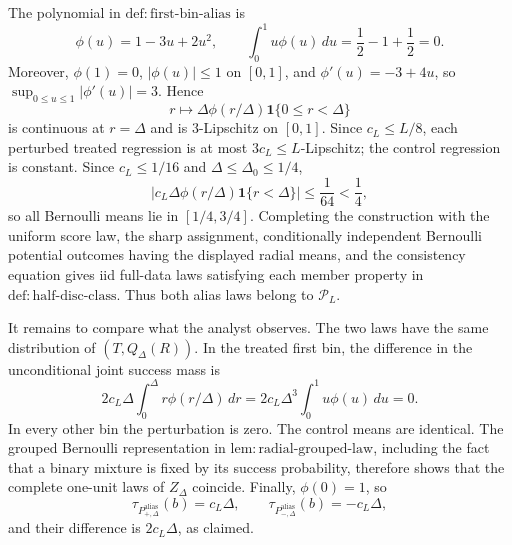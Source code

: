 The polynomial in \(\mathrm{def:first\text{-}bin\text{-}alias}\) is
\[
 \phi(u)=1-3u+2u^2,
 \qquad
 \int_0^1u\phi(u)\,du
 =\frac12-1+\frac12=0.
\]
Moreover, \(\phi(1)=0\), \(|\phi(u)|\le1\) on \([0,1]\), and \(\phi'(u)=-3+4u\), so \(\sup_{0\le u\le1}|\phi'(u)|=3\).  Hence
\[
 r\longmapsto \Delta\phi(r/\Delta)\mathbf 1\{0\le r<\Delta\}
\]
is continuous at \(r=\Delta\) and is \(3\)-Lipschitz on \([0,1]\).  Since \(c_L\le L/8\), each perturbed treated regression is at most \(3c_L\le L\)-Lipschitz; the control regression is constant.  Since \(c_L\le1/16\) and \(\Delta\le\Delta_0\le1/4\),
\[
 \left|c_L\Delta\phi(r/\Delta)\mathbf 1\{r<\Delta\}\right|
 \le \frac1{64}<\frac14,
\]
so all Bernoulli means lie in \([1/4,3/4]\).  Completing the construction with the uniform score law, the sharp assignment, conditionally independent Bernoulli potential outcomes having the displayed radial means, and the consistency equation gives iid full-data laws satisfying each member property in \(\mathrm{def:half\text{-}disc\text{-}class}\).  Thus both alias laws belong to \(\mathcal P_L\).

It remains to compare what the analyst observes.  The two laws have the same distribution of \((T,Q_\Delta(R))\).  In the treated first bin, the difference in the unconditional joint success mass is
\[
 2c_L\Delta\int_0^\Delta r\phi(r/\Delta)\,dr
 =2c_L\Delta^3\int_0^1u\phi(u)\,du=0.
\]
In every other bin the perturbation is zero.  The control means are identical.  The grouped Bernoulli representation in \(\mathrm{lem:radial\text{-}grouped\text{-}law}\), including the fact that a binary mixture is fixed by its success probability, therefore shows that the complete one-unit laws of \(Z_\Delta\) coincide.  Finally, \(\phi(0)=1\), so
\[
 \tau_{P^{\mathrm{alias}}_{+,\Delta}}(b)=c_L\Delta,
 \qquad
 \tau_{P^{\mathrm{alias}}_{-,\Delta}}(b)=-c_L\Delta,
\]
and their difference is \(2c_L\Delta\), as claimed.